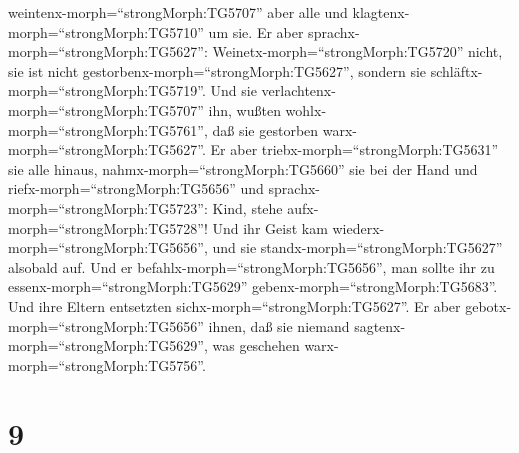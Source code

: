 weintenx-morph=``strongMorph:TG5707'' aber alle und
klagtenx-morph=``strongMorph:TG5710'' um sie. Er aber
sprachx-morph=``strongMorph:TG5627'':
Weinetx-morph=``strongMorph:TG5720'' nicht, sie ist nicht
gestorbenx-morph=``strongMorph:TG5627'', sondern sie
schläftx-morph=``strongMorph:TG5719''.  Und sie
verlachtenx-morph=``strongMorph:TG5707'' ihn, wußten
wohlx-morph=``strongMorph:TG5761'', daß sie gestorben
warx-morph=``strongMorph:TG5627''.  Er aber
triebx-morph=``strongMorph:TG5631'' sie alle hinaus,
nahmx-morph=``strongMorph:TG5660'' sie bei der Hand und
riefx-morph=``strongMorph:TG5656'' und
sprachx-morph=``strongMorph:TG5723'': Kind, stehe
aufx-morph=``strongMorph:TG5728''!  Und ihr Geist kam
wiederx-morph=``strongMorph:TG5656'', und sie
standx-morph=``strongMorph:TG5627'' alsobald auf. Und er
befahlx-morph=``strongMorph:TG5656'', man sollte ihr zu
essenx-morph=``strongMorph:TG5629'' gebenx-morph=``strongMorph:TG5683''.
 Und ihre Eltern entsetzten
sichx-morph=``strongMorph:TG5627''. Er aber
gebotx-morph=``strongMorph:TG5656'' ihnen, daß sie niemand
sagtenx-morph=``strongMorph:TG5629'', was geschehen
warx-morph=``strongMorph:TG5756''.

\hypertarget{section-8}{%
\section{9}\label{section-8}}

